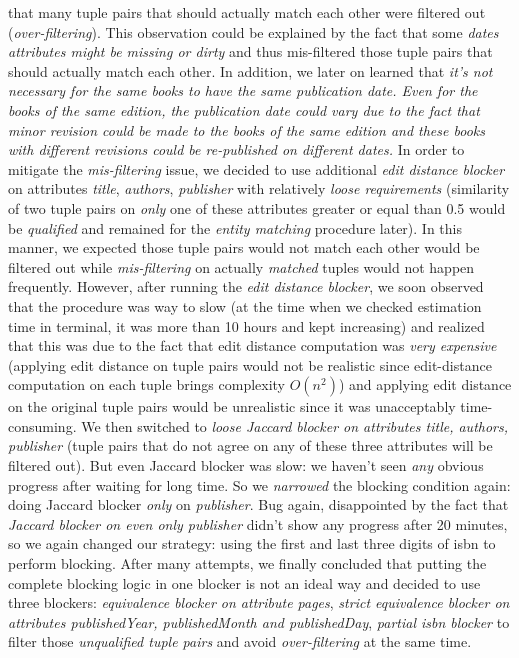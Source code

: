 \documentclass[10pt, oneside]{article}
\begin{document}
that many tuple pairs that should actually match each other were filtered out (\textit{over-filtering}). This observation could be explained by the fact that some \textit{dates attributes might be missing or dirty}  and thus mis-filtered those tuple pairs that should actually match each other. In addition, we later on learned that \textit{it's not necessary for the same books to have the same publication date. Even for the books of the same edition, the publication date could vary due to the fact that minor revision could be made to the books of the same edition and these books with different revisions could be re-published on different dates.} In order to mitigate the \textit{mis-filtering} issue, we decided to use additional \textit{edit distance blocker} on attributes \textit{title}, \textit{authors}, \textit{publisher} with relatively \textit{loose requirements} (similarity of two tuple pairs on \textit{only} one of these attributes greater or equal than 0.5 would be \textit{qualified} and remained for the \textit{entity matching} procedure later). In this manner, we expected those tuple pairs would not match each other would be filtered out while \textit{mis-filtering} on actually \textit{matched} tuples would not happen frequently. However, after running the \textit{edit distance blocker}, we soon observed that the procedure was way to slow (at the time when we checked estimation time in terminal, it was more than 10 hours and kept increasing) and realized that this was due to the fact that edit distance computation was \textit{very expensive} (applying edit distance on tuple pairs would not be realistic since edit-distance computation on each tuple brings complexity $O(n^2)$) and applying edit distance on the original tuple pairs would be unrealistic since it was unacceptably time-consuming. We then switched to \textit{loose Jaccard blocker on attributes title, authors, publisher} (tuple
pairs that do not agree on any of these three attributes will be filtered out). But even {Jaccard blocker} was slow: we haven't seen \textit{any} obvious progress after waiting for long time. So we \textit{narrowed} the blocking condition again: doing Jaccard blocker \textit{only} on \textit{publisher}. Bug again, disappointed by the fact that \textit{Jaccard blocker on even only publisher} didn't show any progress after 20 minutes, so we again changed our strategy: 
using the first and last three digits of isbn to perform blocking. After many attempts, we finally concluded that putting the complete blocking logic in one blocker is not an ideal way and decided to use three blockers: \textit{equivalence blocker on attribute pages}, \textit{strict equivalence blocker on attributes publishedYear, publishedMonth and publishedDay}, \textit{partial isbn blocker} to filter those \textit{unqualified tuple pairs} and avoid \textit{over-filtering} at the same time.
\end{document}
